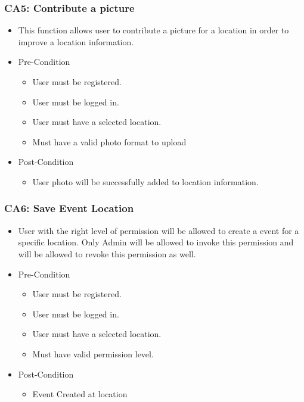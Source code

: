 \documentclass[12pt,a4paper]{article}
\begin{document}
		\subsubsection{CA5: Contribute a picture}
			\begin{itemize}
				\item This function allows user to contribute a picture for a location in order to improve a location information.
				\item Pre-Condition
					\begin{itemize}
						\item User must be registered.
						\item User must be logged in.
						\item User must have a selected location.
						\item Must have a valid photo format to upload
					\end{itemize}
				\item Post-Condition
					\begin{itemize}
						\item User photo will be successfully added to location information.
					\end{itemize}
			\end{itemize}
		\subsubsection{CA6: Save Event Location}
			\begin{itemize}
				\item User with the right level of permission will be allowed to create a event for a specific location. Only Admin will be allowed to invoke this permission and will be allowed to revoke this permission as well.
				\item Pre-Condition
					\begin{itemize}
						\item User must be registered.
						\item User must be logged in.
						\item User must have a selected location.
						\item Must have valid permission level.
					\end{itemize}
				\item Post-Condition
					\begin{itemize}
						\item Event Created at location
					\end{itemize}
			\end{itemize}
\end{document}
